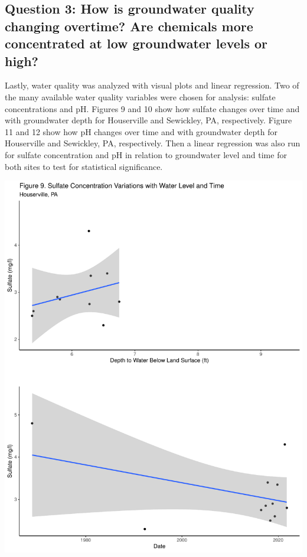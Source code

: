 \documentclass[
  12pt,
]{article}
\begin{document}
\hypertarget{question-3-how-is-groundwater-quality-changing-overtime-are-chemicals-more-concentrated-at-low-groundwater-levels-or-high}{%
\subsection{Question 3: How is groundwater quality changing overtime?
Are chemicals more concentrated at low groundwater levels or
high?}\label{question-3-how-is-groundwater-quality-changing-overtime-are-chemicals-more-concentrated-at-low-groundwater-levels-or-high}}

Lastly, water quality was analyzed with visual plots and linear
regression. Two of the many available water quality variables were
chosen for analysis: sulfate concentrations and pH. Figures 9 and 10
show how sulfate changes over time and with groundwater depth for
Houserville and Sewickley, PA, respectively. Figure 11 and 12 show how
pH changes over time and with groundwater depth for Houserville and
Sewickley, PA, respectively. Then a linear regression was also run for
sulfate concentration and pH in relation to groundwater level and time
for both sites to test for statistical significance.

\includegraphics{Draft_Final_files/figure-latex/groundwater_quality-1.pdf}
\end{document}
